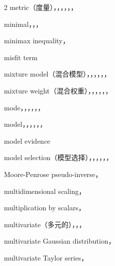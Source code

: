 \begin{multicols}{2}
\noindent metric（度量），，，，，，\par
\noindent minimal，，，\par
\noindent minimax inequality，\par
\noindent misfit term\par
\noindent mixture model（混合模型），，，，，，\par
\noindent mixture weight（混合权重），，，，，，\par
\noindent mode，，，，，，\par
\noindent model，，，，，，\par
\noindent model evidence\par
\noindent model selection（模型选择），，，，，，\par
\noindent Moore-Penrose pseudo-inverse，\par
\noindent multidimensional scaling，\par
\noindent multiplication by scalars，\par
\noindent multivariate（多元的），，，\par
\noindent multivariate Gaussian distribution，\par
\noindent multivariate Taylor series，\par


\end{multicols}
